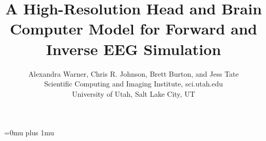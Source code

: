 \documentclass[11pt]{article}
\begin{document}
\title{A High-Resolution Head and Brain Computer Model for Forward and Inverse EEG Simulation}
\author{Alexandra Warner, Chris R. Johnson, Brett Burton, and Jess Tate \\
Scientific Computing and Imaging Institute, sci.utah.edu\\
 University of Utah, Salt Lake City, UT\\}
\maketitle









\newpage
\Urlmuskip=0mu plus 1mu\relax


\end{document}
